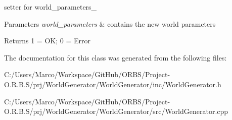 setter for world\-\_\-parameters\-\_\- 


\begin{DoxyParams}{Parameters}
{\em world\-\_\-parameters} & contains the new world parameters \\
\hline
\end{DoxyParams}
\begin{DoxyReturn}{Returns}
1 = O\-K; 0 = Error 
\end{DoxyReturn}


The documentation for this class was generated from the following files\-:\begin{DoxyCompactItemize}
\item 
C\-:/\-Users/\-Marco/\-Workspace/\-Git\-Hub/\-O\-R\-B\-S/\-Project-\/\-O.\-R.\-B.\-S/prj/\-World\-Generator/\-World\-Generator/inc/World\-Generator.\-h\item 
C\-:/\-Users/\-Marco/\-Workspace/\-Git\-Hub/\-O\-R\-B\-S/\-Project-\/\-O.\-R.\-B.\-S/prj/\-World\-Generator/\-World\-Generator/src/World\-Generator.\-cpp\end{DoxyCompactItemize}
